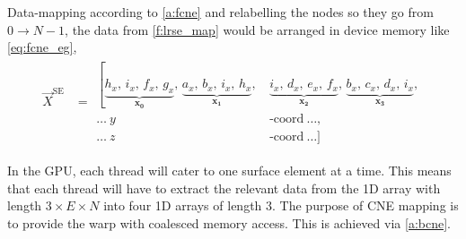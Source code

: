 Data-mapping according to \cref{a:fcne} and relabelling the nodes so they go from $ 0 \to N-1 $, the data from \cref{f:lrse_map} would be arranged in device memory like \cref{eq:fcne_eg},
\begin{align}\label{eq:fcne_eg}
	\vec{X}^{\textrm{SE}} & = \begin{aligned}
		\left[\underbrace{h_{x},\, i_{x},\, f_{x},\, g_{x}}_{\mathbf{x_{0}}},\,
		\underbrace{a_{x},\, b_{x},\, i_{x},\, h_{x}}_{\mathbf{x_{1}}},\,
		\right.  & \underbrace{i_{x},\, d_{x},\, e_{x},\, f_{x}}_{\mathbf{x_{2}}},\,
		\underbrace{b_{x},\, c_{x},\, d_{x},\, i_{x}}_{\mathbf{x_{3}}},              \\
		\ldots~y & \textrm{-coord}~\ldots,                                           \\
		\ldots~z & \textrm{-coord}~\ldots]
	\end{aligned}
\end{align}
%

In the GPU, each thread will cater to one surface element at a time. This means that each thread will have to extract the relevant data from the 1D array with length $ 3\times E\times N $ into four 1D arrays of length $ 3 $. The purpose of CNE mapping is to provide the warp with coalesced memory access. This is achieved via \cref{a:bcne}.


